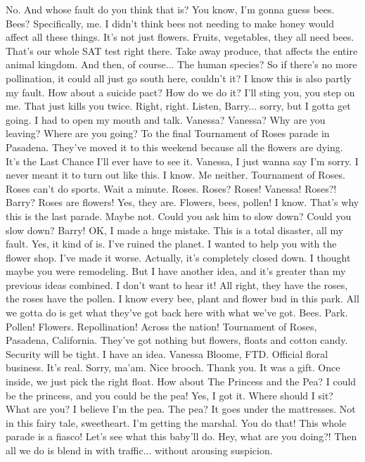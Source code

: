 \documentclass[a4paper,12pt]{article}
\begin{document}
No.
And whose fault do you think that is?
You know, I'm gonna guess bees.
Bees?
Specifically, me.
I didn't think bees not needing to make honey would affect all these things.
It's not just flowers. Fruits, vegetables, they all need bees.
That's our whole SAT test right there.
Take away produce, that affects the entire animal kingdom.
And then, of course...
The human species?
So if there's no more pollination, it could all just go south here, couldn't it?
I know this is also partly my fault.
How about a suicide pact?
How do we do it?
I'll sting you, you step on me.
That just kills you twice.
Right, right.
Listen, Barry... sorry, but I gotta get going.
I had to open my mouth and talk.
Vanessa?
Vanessa? Why are you leaving?
Where are you going?
To the final Tournament of Roses parade in Pasadena.
They've moved it to this weekend because all the flowers are dying.
It's the Last Chance I'll ever have to see it.
Vanessa, I just wanna say I'm sorry.
I never meant it to turn out like this.
I know. Me neither.
Tournament of Roses.
Roses can't do sports.
Wait a minute. Roses. Roses?
Roses!
Vanessa!
Roses?!
Barry?
Roses are flowers!
Yes, they are.
Flowers, bees, pollen!
I know.
That's why this is the last parade.
Maybe not.
Could you ask him to slow down?
Could you slow down?
Barry!
OK, I made a huge mistake.
This is a total disaster, all my fault.
Yes, it kind of is.
I've ruined the planet. I wanted to help you with the flower shop. I've made it worse.
Actually, it's completely closed down.
I thought maybe you were remodeling.
But I have another idea, and it's greater than my previous ideas combined.
I don't want to hear it!
All right, they have the roses, the roses have the pollen.
I know every bee, plant and flower bud in this park.
All we gotta do is get what they've got back here with what we've got.
Bees.
Park.
Pollen!
Flowers.
Repollination!
Across the nation!
Tournament of Roses, Pasadena, California.
They've got nothing but flowers, floats and cotton candy.
Security will be tight.
I have an idea.
Vanessa Bloome, FTD.
Official floral business. It's real.
Sorry, ma'am. Nice brooch.
Thank you. It was a gift.
Once inside, we just pick the right float.
How about The Princess and the Pea?
I could be the princess, and you could be the pea!
Yes, I got it.
Where should I sit?
What are you?
I believe I'm the pea.
The pea?
It goes under the mattresses.
Not in this fairy tale, sweetheart.
I'm getting the marshal.
You do that! This whole parade is a fiasco!
Let's see what this baby'll do.
Hey, what are you doing?!
Then all we do is blend in with traffic... without arousing suspicion.
\end{document}
